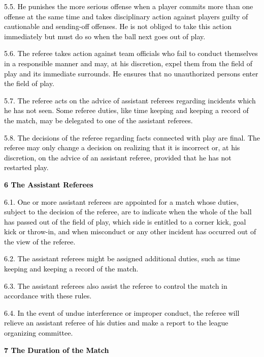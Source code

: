 \documentclass[a4paper]{article}
\begin{document}
\textcolor{black}{5.5. He punishes the more serious offense when a player commits more than one offense at the same time
and takes disciplinary action against players guilty of cautionable and sending-off offenses. He is not obliged to take
this action immediately but must do so when the ball next goes out of play.}

\textcolor{black}{5.6. The referee takes action against team officials who fail to conduct themselves in a responsible
manner and may, at his discretion, expel them from the field of play and its immediate surrounds. He ensures that no
unauthorized persons enter the field of play.}

\textcolor{black}{5.7. The referee acts on the advice of assistant referees regarding incidents which he has not seen.
Some referee duties, like time keeping and keeping a record of the match, may be delegated to one of the assistant
referees.}

\textcolor{black}{5.8. The decisions of the referee regarding facts connected with play are final. The referee may only
change a decision on realizing that it is incorrect or, at his discretion, on the advice of an assistant referee,
provided that he has not restarted play.}


\bigskip


\bigskip

\textbf{\textcolor{black}{6 The Assistant Referees}}

\textcolor{black}{6.1. One or more assistant referees are appointed for a match whose duties, subject to the decision of
the referee, are to indicate when the whole of the ball has passed out of the field of play, which side is entitled to
a corner kick, goal kick or throw-in, and when misconduct or any other incident has occurred out of the view of the
referee.}

\textcolor{black}{6.2. The assistant referees might be assigned additional duties, such as time keeping and keeping a
record of the match.}

\textcolor{black}{6.3. The assistant referees also assist the referee to control the match in accordance with these
rules.}

\textcolor{black}{6.4. In the event of undue interference or improper conduct, the referee will relieve an assistant
referee of his duties and make a report to the league organizing committee.}


\bigskip

\textbf{\textcolor{black}{7 The Duration of the Match}}
\end{document}
